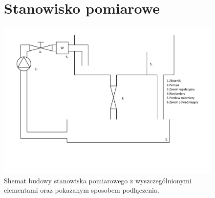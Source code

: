 \documentclass[
12pt, %
a4paper, %
oneside, %
]{article}
\begin{document}

    

    \tableofcontents
    \listoffigures
    \listoftables
    \begin{landscape}
        \begin{figure}
            \section{Stanowisko pomiarowe}
            \centering
            \includegraphics[width=\linewidth-142px]
                {Figures/PDF/Stanowisko_pomiarowe.pdf}
                \caption{Shemat budowy stanowiska pomiarowego z wyszczególnionymi elementami oraz pokazanym sposobem podlączenia.}
        \end{figure}
    \end{landscape}
    
    
    
    
     
\end{document}
